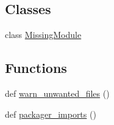 \subsection*{Classes}
\begin{DoxyCompactItemize}
\item 
class \hyperlink{classpygame_1_1_missing_module}{Missing\+Module}
\end{DoxyCompactItemize}
\subsection*{Functions}
\begin{DoxyCompactItemize}
\item 
def \hyperlink{namespacepygame_a76d77d6c5c9eeda84168f6a5073fbea2}{warn\+\_\+unwanted\+\_\+files} ()
\item 
def \hyperlink{namespacepygame_a28ba3de162ca0d56169f21417e17a9cb}{packager\+\_\+imports} ()
\end{DoxyCompactItemize}
